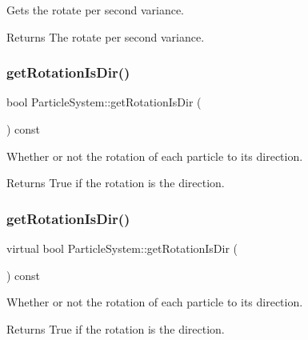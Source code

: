 Gets the rotate per second variance.

\begin{DoxyReturn}{Returns}
The rotate per second variance. 
\end{DoxyReturn}
\mbox{\label{classParticleSystem_aae89ceed355b56151c046ac4b4091c1e}} 
\subsubsection{\texorpdfstring{get\+Rotation\+Is\+Dir()}{getRotationIsDir()}\hspace{0.1cm}{\footnotesize\ttfamily [1/2]}}
{\footnotesize\ttfamily bool Particle\+System\+::get\+Rotation\+Is\+Dir (\begin{DoxyParamCaption}{ }\end{DoxyParamCaption}) const\hspace{0.3cm}{\ttfamily [virtual]}}

Whether or not the rotation of each particle to its direction.

\begin{DoxyReturn}{Returns}
True if the rotation is the direction. 
\end{DoxyReturn}
\mbox{\label{classParticleSystem_a6c1bd547596cb5bfbc47bc0a864750f4}} 
\subsubsection{\texorpdfstring{get\+Rotation\+Is\+Dir()}{getRotationIsDir()}\hspace{0.1cm}{\footnotesize\ttfamily [2/2]}}
{\footnotesize\ttfamily virtual bool Particle\+System\+::get\+Rotation\+Is\+Dir (\begin{DoxyParamCaption}{ }\end{DoxyParamCaption}) const\hspace{0.3cm}{\ttfamily [virtual]}}

Whether or not the rotation of each particle to its direction.

\begin{DoxyReturn}{Returns}
True if the rotation is the direction. 
\end{DoxyReturn}
\mbox{\label{classParticleSystem_a61545eb1a87b37e75981c5954b0a9546}} 
